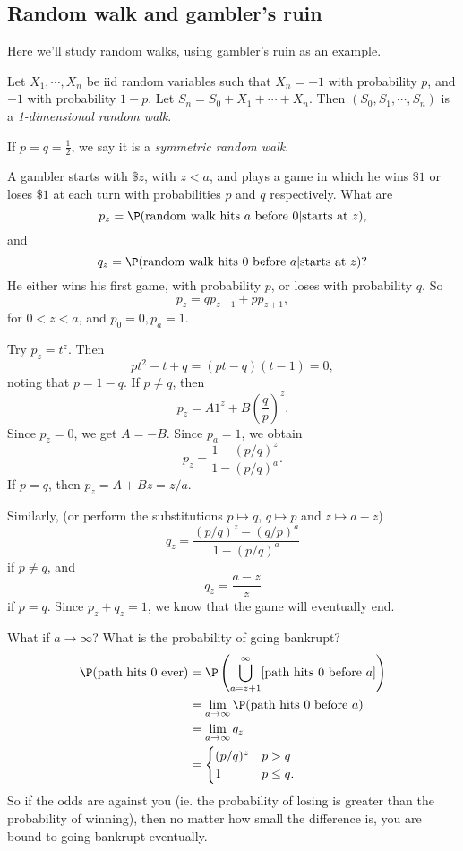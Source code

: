 \documentclass[a4paper]{article}
\begin{document}
\subsection{Random walk and gambler's ruin}
Here we'll study random walks, using gambler's ruin as an example.

\begin{defi}
  Let $X_1, \cdots, X_n$ be iid random variables such that $X_n = +1$ with probability $p$, and $-1$ with probability $1 - p$. Let $S_n = S_0 + X_1 + \cdots + X_n$. Then $(S_0, S_1, \cdots, S_n)$ is a \emph{1-dimensional random walk}.

  If $p = q = \frac{1}{2}$, we say it is a \emph{symmetric random walk}.
\end{defi}

\begin{eg}
  A gambler starts with $\$z$, with $z < a$, and plays a game in which he wins $\$1$ or loses $\$ 1$ at each turn with probabilities $p$ and $q$ respectively. What are
  \[
    p_z = \P(\text{random walk hits $a$ before } 0 | \text{starts at } z),
  \]
  and
  \[
    q_z = \P(\text{random walk hits 0 before }a | \text{starts at }z)?
  \]
  He either wins his first game, with probability $p$, or loses with probability $q$. So
  \[
    p_z = qp_{z - 1} + pp_{z + 1},
  \]
  for $0 < z < a$, and $p_0 = 0, p_a = 1$.

  Try $p_z = t^z$. Then
  \[
    pt^2 - t + q = (pt - q)(t - 1) = 0,
  \]
  noting that $p = 1 - q$. If $p \not = q$, then
  \[
    p_z = A1^z + B\left(\frac{q}{p}\right)^z.
  \]
  Since $p_z = 0$, we get $A = -B$. Since $p_a = 1$, we obtain
  \[
    p_z = \frac{1 - (p/q)^z}{1 - (p/q)^a}.
  \]
  If $p = q$, then $p_z = A + Bz = z/a$.

  Similarly, (or perform the substitutions $p\mapsto q$, $q\mapsto p$ and $z \mapsto a - z$)
  \[
    q_z = \frac{(p/q)^z - (q/p)^a}{1 - (p/q)^a}
  \]
  if $p\not = q$, and
  \[
    q_z = \frac{a - z}{z}
  \]
  if $p = q$. Since $p_z + q_z = 1$, we know that the game will eventually end.

  What if $a\to \infty$? What is the probability of going bankrupt?
  \begin{align*}
    \P(\text{path hits 0 ever}) &= \P\left(\bigcup_{a = z+1}^\infty [\text{path hits 0 before }a]\right)\\
    &= \lim_{a\to \infty}\P(\text{path hits 0 before }a)\\
    &= \lim_{a\to \infty}q_z\\
    &= \begin{cases}
      (p/q)^z & p > q\\
      1 & p \leq q.
    \end{cases}
  \end{align*}
  So if the odds are against you (ie. the probability of losing is greater than the probability of winning), then no matter how small the difference is, you are bound to going bankrupt eventually.
\end{eg}
\end{document}
